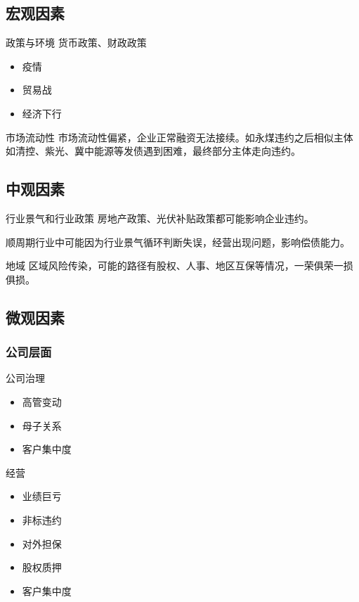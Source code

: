 \subsection{宏观因素}
\begin{frame}{政策与环境}
	货币政策、财政政策
	\begin{itemize}
		\item 疫情 \cite{mirza2020impact}
		\item 贸易战
		\item 经济下行 \citet{bali2021macroeconomic}
	\end{itemize}
\end{frame}


\begin{frame}{市场流动性}
	市场流动性偏紧，企业正常融资无法接续。如永煤违约之后相似主体如清控、紫光、冀中能源等发债遇到困难，最终部分主体走向违约。
\end{frame}

\subsection{中观因素}
\begin{frame}{行业景气和行业政策}
	房地产政策、光伏补贴政策都可能影响企业违约。

	顺周期行业中可能因为行业景气循环判断失误，经营出现问题，影响偿债能力。
\end{frame}
\begin{frame}{地域}
	区域风险传染，可能的路径有股权、人事、地区互保等情况，一荣俱荣一损俱损。
\end{frame}
\subsection{微观因素}
\subsubsection{公司层面}
\begin{frame}{公司治理}
	\begin{itemize}
		\item 高管变动\cite{林晚发2018高管任职经历的得与失}
		\item 母子关系
		\item 客户集中度\cite{王雄元2017客户集中度与公司债二级市场信用利差}
	\end{itemize}
\end{frame}

\begin{frame}{经营}
	\begin{itemize}
		\item 业绩巨亏
		\item 非标违约
		\item 对外担保
		\item 股权质押
		\item 客户集中度 \citep{王雄元2017客户集中度与公司债二级市场信用利差}
	\end{itemize}
\end{frame}

